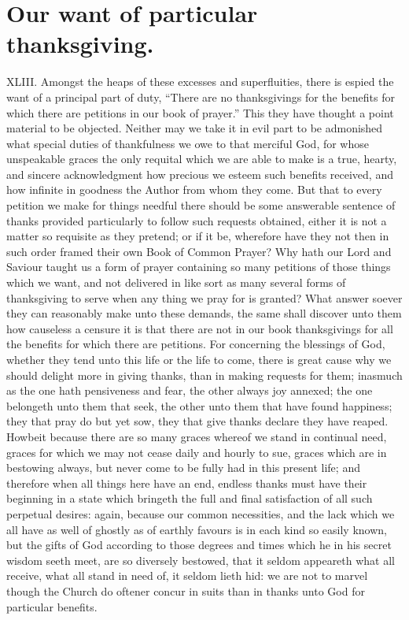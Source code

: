 \section*{Our want of particular thanksgiving.}
XLIII. Amongst the heaps of these excesses and superfluities, there is espied the want of a principal part of duty, “There are no thanksgivings for the benefits for which there are petitions in our book of prayer.” This they have thought a point material to be objected. Neither may we take it in evil part to be admonished what special duties of thankfulness we owe to that merciful God, for whose unspeakable graces the only requital which we are able to make is a true, hearty, and sincere acknowledgment how precious we esteem such benefits received, and how infinite in goodness the Author  from whom they come. But that to every petition we make for things needful there should be some answerable sentence of thanks provided particularly to follow such requests obtained, either it is not a matter so requisite as they pretend; or if it be, wherefore have they not then in such order framed their own Book of Common Prayer? Why hath our Lord and Saviour taught us a form of prayer containing so many petitions of those things which we want, and not delivered in like sort as many several forms of thanksgiving to serve when any thing we pray for is granted? What answer soever they can reasonably make unto these demands, the same shall discover unto them how causeless a censure it is that there are not in our book thanksgivings for all the benefits for which there are petitions.
For concerning the blessings of God, whether they tend unto this life or the life to come, there is great cause why we should delight more in giving thanks, than in making requests for them; inasmuch as the one hath pensiveness and fear, the other always joy annexed; the one belongeth unto them that seek, the other unto them that have found happiness; they that pray do but yet sow, they that give thanks declare they have reaped. Howbeit because there are so many graces whereof we stand in continual need, graces for which we may not cease daily and hourly to sue, graces which are in bestowing always, but never come to be fully had in this present life; and therefore when all things here have an end, endless thanks must have their beginning in a state which bringeth the full and final satisfaction of all such perpetual desires: again, because our common necessities, and the lack which we all have as well of ghostly as of earthly favours is in each kind so easily known, but the gifts of God according to those degrees and times which he in his secret wisdom seeth meet, are so diversely bestowed, that it seldom appeareth what all receive, what all stand in need of, it seldom lieth hid: we are not to marvel though the Church do oftener concur in suits than in thanks unto God for particular benefits.
